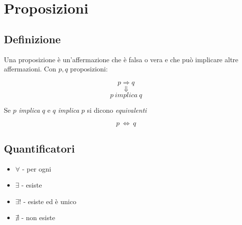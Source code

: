 \documentclass{article}
\begin{document}
\section{Proposizioni}
    \subsection{Definizione}
        Una proposizione è un'affermazione che è falsa o vera e che può implicare altre affermazioni.
        \newpage
        Con $p, q$ proposizioni:

        \begin{LARGE}
            \begin{equation*}
                p \Rightarrow q
            \end{equation*}
        \begin{equation*}
              \Downarrow
        \end{equation*}
        \begin{equation*}
              p\ implica\ q
        \end{equation*}
        \end{LARGE}
        Se $p$ \textit{implica} $q$ e $q$ \textit{implica} $p$ si dicono \textit{equivalenti}\newline
        \begin{LARGE}
            \begin{equation*}
                p\ \iff\ q
            \end{equation*}
        \end{LARGE}
        \subsection{Quantificatori}
            \begin{itemize}
                \item $\forall$ - per ogni
                \item $\exists$ - esiste
                \item $\exists!$ - esiste ed è unico
                \item $\nexists$ - non esiste
            \end{itemize}
\end{document}
